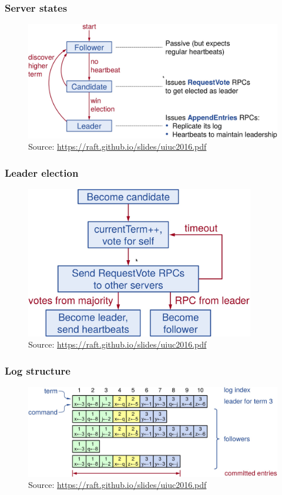 \documentclass[10pt,utf8]{beamer}
\begin{document}
\begin{frame}
	\frametitle{Server states}
	\begin{figure}
		\centering
		\includegraphics[width=12cm]{./img/server_states.eps}
		\caption{\tiny{Source: \url{https://raft.github.io/slides/uiuc2016.pdf}}}
	\end{figure}
\end{frame}


\begin{frame}
	\frametitle{Leader election}
	\begin{figure}
		\centering
		\includegraphics[width=10cm]{./img/leader_election.eps}
		\caption{\tiny{Source: \url{https://raft.github.io/slides/uiuc2016.pdf}}}
	\end{figure}
\end{frame}


\begin{frame}
	\frametitle{Log structure}
	\begin{figure}
		\centering
		\includegraphics[width=12cm]{./img/log_structure.eps}
		\caption{\tiny{Source: \url{https://raft.github.io/slides/uiuc2016.pdf}}}
	\end{figure}
\end{frame}
\end{document}
